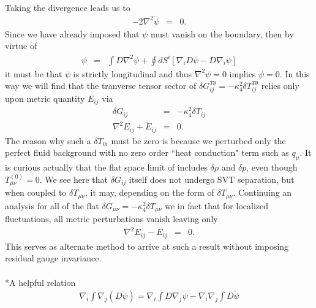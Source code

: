 \documentclass[10pt,letterpaper]{article}
\numberwithin{equation}{section}
\begin{document}
Taking the divergence leads us to 
\begin{eqnarray}
-2\nabla^2 \dot\psi &=& 0.
\end{eqnarray}
Since we have already imposed that $\psi$ must vanish on the boundary, then by virtue of
\begin{eqnarray}
\psi &=& \int D \nabla^2\psi + \oint dS^i[ \nabla_i D \psi - D\nabla_i \psi]
\end{eqnarray}
it must be that $\psi$ is strictly longitudinal and thus $\nabla^2\psi = 0$ implies $\psi = 0$. In this way we will find that the tranverse tensor sector of $\delta G^{T\theta}_{ij} = -\kappa^2_4\delta T^{T\theta}_{ij}$ relies only upon metric quantity $E_{ij}$ via
\begin{eqnarray}
\delta G_{ij} &=& -\kappa^2_4 \delta T_{ij}
\nonumber\\
\nabla^2 E_{ij} + \ddot E_{ij} &=& 0.
\end{eqnarray}
The reason why such a $\delta T_{0i}$ must be zero is because we perturbed only the perfect fluid background with no zero order ``heat conduction" term such as $q_\mu$. It is curious actually that the flat space limit of \cite{Einrw} includes $\delta \rho$ and $\delta p$, even though $T_{\mu\nu}^{(0)}= 0$. We see here that $\delta G_{ij}$ itself does not undergo SVT separation, but when coupled to $\delta T_{\mu\nu}$, it may, depending on the form of $\delta T_{\mu\nu}$. Continuing an analysis for all of the flat $\delta G_{\mu\nu} = -\kappa^2_4 \delta T_{\mu\nu}$ we in fact that for localized fluctuations, all metric perturbations vanish leaving only 
\begin{eqnarray}
\nabla^2E_{ij} - \ddot E_{ij} &=& 0. 
\end{eqnarray}
This serves as alternate method to arrive at such a result without imposing residual gauge invariance. 
\\ \\
*A helpful relation
\begin{eqnarray}
\nabla_i\int \nabla_j(D\ddot\psi) = \nabla_i\int D\nabla_j\ddot\psi  -\nabla_i\nabla_j\int D \ddot\psi 
\end{eqnarray}
%
\end{document}
